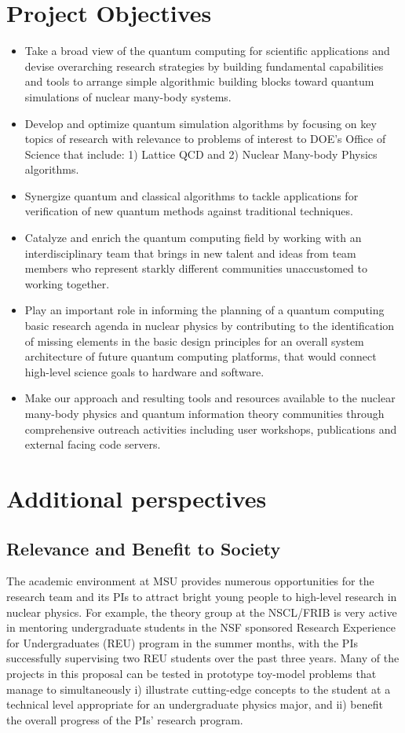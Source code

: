 \documentclass[10pt]{article}
\begin{document}
\section{Project Objectives}
\begin{itemize}
\item Take a broad view of the quantum computing for scientific applications and devise overarching
research strategies by building fundamental capabilities and tools to arrange simple
algorithmic building blocks toward quantum simulations of nuclear many-body systems.
\item  Develop and optimize quantum simulation algorithms by focusing on
key topics of research with relevance to problems of interest to DOE’s Office of Science that
include: 1) Lattice QCD and  2) Nuclear Many-body Physics algorithms.
\item  Synergize quantum and classical algorithms to tackle applications for verification of new
quantum methods against traditional techniques.
\item  Catalyze and enrich the quantum computing field by working with an interdisciplinary team
that brings in new talent and ideas from team members who represent starkly different communities
unaccustomed to working together.
\item  Play an important role in informing the planning of a quantum computing basic research
agenda in nuclear physics by contributing to the identification of missing elements in the basic design
principles for an overall system architecture of future quantum computing platforms, that
would connect high-level science goals to hardware and software.
\item  Make our approach and resulting tools and resources available to the nuclear many-body physics and quantum information theory  communities
through comprehensive outreach activities including user workshops, publications and
external facing code servers.
\end{itemize}

\section{Additional perspectives}

\subsection{Relevance and Benefit to Society}

The academic environment at MSU provides numerous opportunities for
the research team and its PIs to attract bright young people to high-level research in
nuclear physics. For example, the theory group at the NSCL/FRIB is very
active in mentoring undergraduate students in the NSF sponsored
Research Experience for Undergraduates (REU) program in the summer
months, with the PIs successfully supervising two REU students over
the past three years. Many of the projects in this proposal can be
tested in prototype toy-model problems that manage to simultaneously
i) illustrate cutting-edge concepts to the student at a technical
level appropriate for an undergraduate physics major, and ii) benefit
the overall progress of the PIs' research program.
\end{document}

